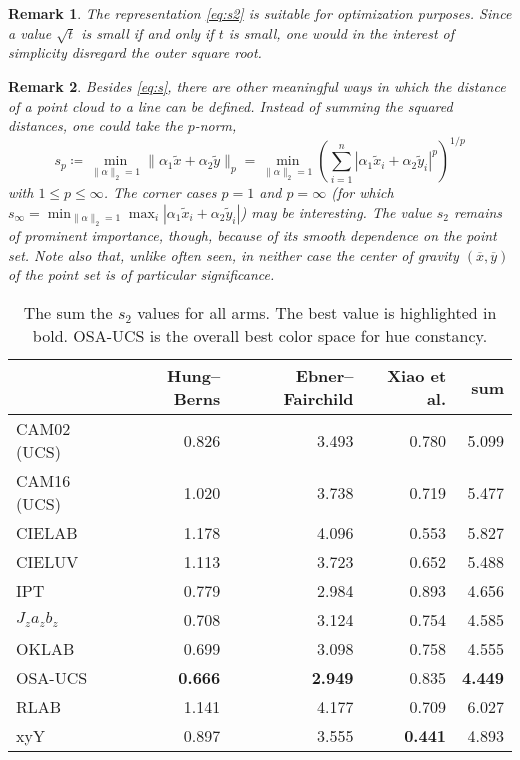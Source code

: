 \documentclass{scrartcl}
\newtheorem*{remark}{Remark}
\theoremstyle{named}
\begin{document}
\begin{remark}
  The representation \eqref{eq:s2} is suitable for optimization purposes. Since a value
  $\sqrt{t}$ is small if and only if $t$ is small, one would in the interest of
  simplicity disregard the outer square root.
\end{remark}

\begin{remark}
Besides \eqref{eq:s}, there are other meaningful ways in which the distance of a point
cloud to a line can be defined. Instead of summing the squared distances, one could take
the $p$-norm,
\[
s_p
  \coloneqq \min_{\|\alpha\|_2=1} \|\alpha_1 \tilde{x} + \alpha_2\tilde{y}\|_p
= \min_{\|\alpha\|_2=1}
  \left(\sum_{i=1}^n |\alpha_1 \tilde{x}_i + \alpha_2 \tilde{y}_i|^p\right)^{1/p}
\]
  with $1\le p \le \infty$. The corner cases $p=1$ and $p=\infty$ (for which
  $s_{\infty}=\min_{\|\alpha\|_2=1} \max_i |\alpha_1 \tilde{x}_i + \alpha_2
  \tilde{y}_i|$) may be interesting. The value $s_2$ remains of prominent importance,
  though, because of its smooth dependence on the point set.
  Note also that, unlike often seen, in neither case the center of gravity
  $(\overline{x}, \overline{y})$ of the point set is of particular significance.
\end{remark}


\begin{table}
  \centering
  \begin{tabular}{lrrrr}
    \toprule
    & Hung--Berns & Ebner--Fairchild & Xiao et al. & sum\\
    \midrule
CAM02 (UCS)   &         0.826  &         3.493  &         0.780  &         5.099\\
CAM16 (UCS)   &         1.020  &         3.738  &         0.719  &         5.477\\
CIELAB        &         1.178  &         4.096  &         0.553  &         5.827\\
CIELUV        &         1.113  &         3.723  &         0.652  &         5.488\\
IPT           &         0.779  &         2.984  &         0.893  &         4.656\\
$J_z a_z b_z$ &         0.708  &         3.124  &         0.754  &         4.585\\
OKLAB         &         0.699  &         3.098  &         0.758  &         4.555\\
OSA-UCS       & \textbf{0.666} & \textbf{2.949} &         0.835  & \textbf{4.449}\\
RLAB          &         1.141  &         4.177  &         0.709  &         6.027\\
xyY           &         0.897  &         3.555  & \textbf{0.441} &         4.893\\
    \bottomrule
  \end{tabular}
  \caption{The sum the $s_2$ values for all arms. The best value is highlighted in bold.
  OSA-UCS is the overall best color space for hue constancy.}
\end{table}
\end{document}
